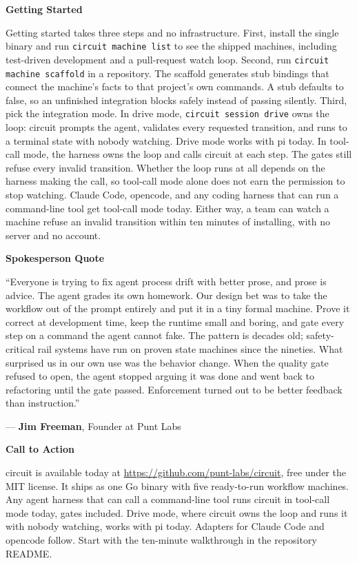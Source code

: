 \documentclass[11pt,letterpaper]{article}
\newcommand{\prsection}[1]{%
  \vspace{1em}%
  {\large\bfseries\color{SectionBlue}#1}%
  \vspace{0.3em}\par%
}
\begin{document}
\prsection{Getting Started}

Getting started takes three steps and no infrastructure. First, install the single binary and run \mbox{\texttt{circuit machine list}} to see the shipped machines, including test-driven development and a pull-request watch loop. Second, run \mbox{\texttt{circuit machine scaffold}} in a repository. The scaffold generates stub bindings that connect the machine's facts to that project's own commands. A stub defaults to false, so an unfinished integration blocks safely instead of passing silently. Third, pick the integration mode. In drive mode, \mbox{\texttt{circuit session drive}} owns the loop: circuit prompts the agent, validates every requested transition, and runs to a terminal state with nobody watching. Drive mode works with pi today. In tool-call mode, the harness owns the loop and calls circuit at each step. The gates still refuse every invalid transition. Whether the loop runs at all depends on the harness making the call, so tool-call mode alone does not earn the permission to stop watching. Claude Code, opencode, and any coding harness that can run a command-line tool get tool-call mode today. Either way, a team can watch a machine refuse an invalid transition within ten minutes of installing, with no server and no account.

\prsection{Spokesperson Quote}

\begin{spokespersonquote}
``Everyone is trying to fix agent process drift with better prose, and prose is advice. The agent grades its own homework. Our design bet was to take the workflow out of the prompt entirely and put it in a tiny formal machine. Prove it correct at development time, keep the runtime small and boring, and gate every step on a command the agent cannot fake. The pattern is decades old; safety-critical rail systems have run on proven state machines since the nineties. What surprised us in our own use was the behavior change. When the quality gate refused to open, the agent stopped arguing it was done and went back to refactoring until the gate passed. Enforcement turned out to be better feedback than instruction.''

\raggedleft --- \textbf{Jim Freeman}, Founder at Punt Labs
\end{spokespersonquote}

\prsection{Call to Action}

circuit is available today at \url{https://github.com/punt-labs/circuit}, free under the MIT license. It ships as one Go binary with five ready-to-run workflow machines. Any agent harness that can call a command-line tool runs circuit in tool-call mode today, gates included. Drive mode, where circuit owns the loop and runs it with nobody watching, works with pi today. Adapters for Claude Code and opencode follow. Start with the ten-minute walkthrough in the repository README.
\end{document}
